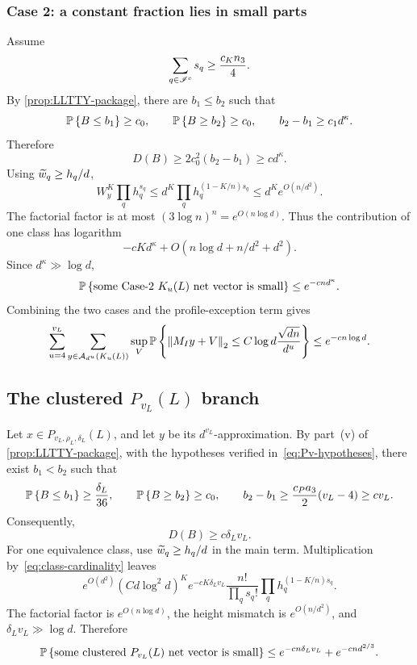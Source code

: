 \subsubsection{Case 2: a constant fraction lies in small parts}

Assume
\[
  \sum_{q\in\mathscr I^c}s_q\ge\frac{c_K n_3}{4}.
\]
By 
\cref{prop:LLTTY-package}, there are $b_1\le b_2$ such that
\[
  \mathbb P\left\{B\le b_1\right\}\ge c_0,
  \qquad
  \mathbb P\left\{B\ge b_2\right\}\ge c_0,
  \qquad
  b_2-b_1\ge c_1d^\kappa.
\]
Therefore
\begin{equation}\label{eq:Ku-case2-dispersion}
  D(B)\ge2c_0^2(b_2-b_1)\ge cd^\kappa.
\end{equation}
Using $\widetilde w_q\ge h_q/d$,
\[
  W_y^K\prod_qh_q^{s_q}
  \le d^K\prod_qh_q^{(1-K/n)s_q}
  \le d^Ke^{O(n/d^2)}.
\]
The factorial factor is at most $(3\log n)^n=e^{O(n\log d)}$. Thus the contribution of one class has logarithm
\[
  -cKd^\kappa+O(n\log d+n/d^2+d^2).
\]
Since $d^\kappa\gg\log d$,
\begin{equation}\label{eq:Ku-case2-prob}
  \mathbb P\left\{\text{some Case-2 $K_u(L)$ net vector is small}\right\}
  \le e^{-cnd^\kappa}.
\end{equation}
Combining the two cases and the profile-exception term gives
\begin{equation}\label{eq:Ku-total}
  \sum_{u=4}^{v_L}
  \sum_{y\in\mathcal A_{d^u}(K_u(L))}
  \sup_V\mathbb P\left\{\left\|M_Iy+V\right\|_2\le C\log d\frac{\sqrt{dn}}{d^u}\right\}
  \le e^{-cn\log d}.
\end{equation}

\subsection{\texorpdfstring{The clustered $P_{v_L}(L)$ branch}{The clustered P-vL(L) branch}}

Let $x\in P_{v_L,\rho_L,\delta_L}(L)$, and let $y$ be its $d^{v_L}$-approximation. By part~(v) of 
\cref{prop:LLTTY-package}, with the hypotheses verified in~\eqref{eq:Pv-hypotheses}, there exist $b_1<b_2$ such that
\[
  \mathbb P\left\{B\le b_1\right\}\ge\frac{\delta_L}{36},
  \qquad
  \mathbb P\left\{B\ge b_2\right\}\ge c_0,
  \qquad
  b_2-b_1\ge\frac{c_P a_3}{2}(v_L-4)\ge cv_L.
\]
Consequently,
\begin{equation}\label{eq:Pv-dispersion}
  D(B)\ge c\delta_Lv_L.
\end{equation}
For one equivalence class, use $\widetilde w_q\ge h_q/d$ in the main term. Multiplication by~\eqref{eq:class-cardinality} leaves
\[
  e^{O(d^2)}(Cd\log^2d)^Ke^{-cK\delta_Lv_L}
  \frac{n!}{\prod_qs_q!}
  \prod_qh_q^{(1-K/n)s_q}.
\]
The factorial factor is $e^{O(n\log d)}$, the height mismatch is $e^{O(n/d^2)}$, and $\delta_Lv_L\gg\log d$. Therefore
\begin{equation}\label{eq:Pv-clustered-prob}
  \mathbb P\left\{\text{some clustered $P_{v_L}(L)$ net vector is small}\right\}
  \le e^{-cn\delta_Lv_L}+e^{-cnd^{2/3}}.
\end{equation}

